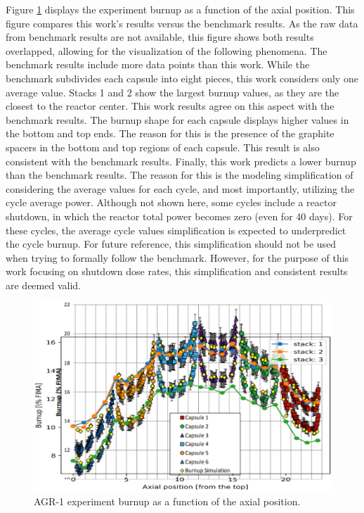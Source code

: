 Figure \ref{fig:agr-deplet} displays the experiment burnup as a function of the axial position.
This figure compares this work's results versus the benchmark results.
As the raw data from benchmark results are not available, this figure shows both results overlapped, allowing for the visualization of the following phenomena.
The benchmark results include more data points than this work.
While the benchmark subdivides each capsule into eight pieces, this work considers only one average value.
Stacks 1 and 2 show the largest burnup values, as they are the closest to the reactor center.
This work results agree on this aspect with the benchmark results.
The burnup shape for each capsule displays higher values in the bottom and top ends.
The reason for this is the presence of the graphite spacers in the bottom and top regions of each capsule.
This result is also consistent with the benchmark results.
Finally, this work predicts a lower burnup than the benchmark results.
The reason for this is the modeling simplification of considering the average values for each cycle, and most importantly, utilizing the cycle average power.
Although not shown here, some cycles include a reactor shutdown, in which the reactor total power becomes zero (even for 40 days).
For these cycles, the average cycle values simplification is expected to underpredict the cycle burnup.
For future reference, this simplification should not be used when trying to formally follow the benchmark.
However, for the purpose of this work focusing on shutdown dose rates, this simplification and consistent results are deemed valid. 

\begin{figure}[htbp!] %
    \centering
    \includegraphics[width=0.9\linewidth]{figures/agr-depletion}
    \hfill
    \caption{AGR-1 experiment burnup as a function of the axial position.}
    \label{fig:agr-deplet}
\end{figure}

